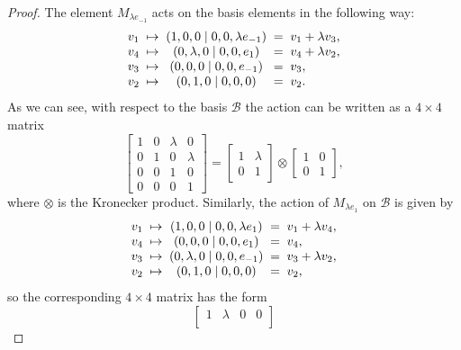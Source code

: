 \begin{proof}
	The element $M_{\lambda e_{-1}}$ acts on the 
	basis elements in the following way:
	\begin{equation*}
		\begin{array}{r@{\;\;}c@{\;\;}c@{\;\;}c@{\;\;}l}
			v_1 & \mapsto & (1,0,0 \mid 0,0,\lambda e_{-1}) & = & v_1 + \lambda v_3, \\
			v_4 & \mapsto & (0,\lambda,0 \mid 0,0,e_1) & = & v_4 + \lambda v_2, \\
			v_3 & \mapsto & (0,0,0 \mid 0,0,e_{-1}) & = & v_3, \\
			v_2 & \mapsto & (0,1,0 \mid 0,0,0) & = & v_2.
		\end{array}
	\end{equation*}
	As we can see, with respect to the basis $\mathcal{B}$ the action can be written
	as a $4\times 4$ matrix
	\begin{equation*}
		\begin{bmatrix}
			1 & 0 & \lambda & 0 \\
			0 & 1 & 0 & \lambda \\
			0 & 0 & 1 & 0 \\
			0 & 0 & 0 & 1
		\end{bmatrix} = 
		\begin{bmatrix}
			1 & \lambda \\
			0 & 1
		\end{bmatrix} \otimes
		\begin{bmatrix}
			1 & 0 \\
			0 & 1
		\end{bmatrix},
	\end{equation*}
	where $\otimes$ is the Kronecker product. Similarly, the action of $M_{\lambda e_1}$ 
	on $\mathcal{B}$ is given by
	\begin{equation*}
		\begin{array}{r@{\;\;}c@{\;\;}c@{\;\;}c@{\;\;}l}
			v_1 & \mapsto & (1,0,0 \mid 0,0,\lambda e_{1}) & = & v_1 + \lambda v_4, \\
			v_4 & \mapsto & (0,0,0 \mid 0,0,e_1) & = & v_4, \\
			v_3 & \mapsto & (0,\lambda,0 \mid 0,0,e_{-1}) & = & v_3 + \lambda v_2, \\
			v_2 & \mapsto & (0,1,0 \mid 0,0,0) & = & v_2,
		\end{array}
	\end{equation*}
	so the corresponding $4\times 4$ matrix has the form
	\begin{equation*}
		\begin{bmatrix}
			1 & \lambda & 0 & 0 \\

\end{bmatrix}
\end{equation*}
\end{proof}
